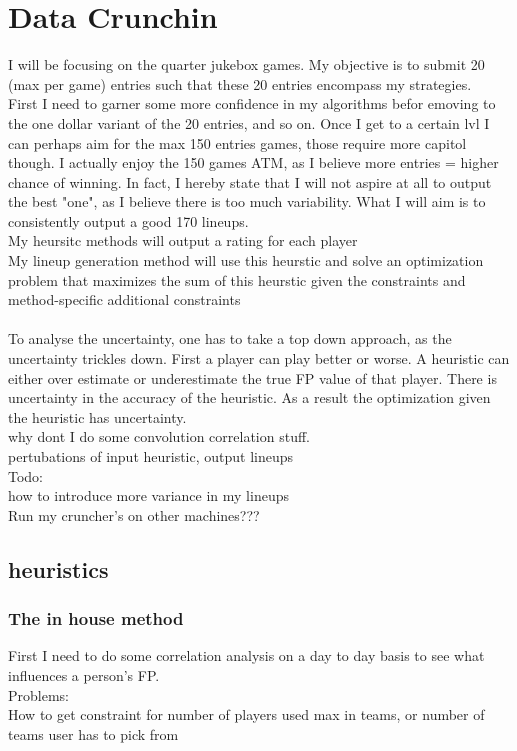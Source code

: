 \documentclass[11pt, oneside]{book}   	%
\begin{document}
\chapter{Data Crunchin}
I will be focusing on the quarter jukebox games. My objective is to submit 20 (max per game) entries such that these 20 entries encompass my strategies. \\ First I need to garner some more confidence in my algorithms befor emoving to the one dollar variant of the 20 entries, and so on. Once I get to a certain lvl I can perhaps aim for the max 150 entries games, those require more capitol though. I actually enjoy the 150 games ATM, as I believe more entries = higher chance of winning. In fact, I hereby state that I will not aspire at all to output the best "one", as I believe there is too much variability. What I will aim is to consistently output a good 170 lineups.  
\\
My heursitc methods will output a rating for each player\\
My lineup generation method will use this heurstic and solve an optimization problem that maximizes the sum of this heurstic given the constraints and method-specific additional constraints\\
\\
To analyse the uncertainty, one has to take a top down approach, as the uncertainty trickles down. First a player can play better or worse. A heuristic can either over estimate or underestimate the true FP value of that player. There is uncertainty in the accuracy of the heuristic. As a result the optimization given the heuristic has uncertainty.
\\
why dont I do some convolution correlation stuff.
\\
pertubations of input heuristic, output lineups
\\
Todo:\\
how to introduce more variance in my lineups\\
Run my cruncher's on other machines???

\section{heuristics} 
\subsection{The in house method}
First I need to do some correlation analysis on a day to day basis to see what influences a person's FP. 
\\
Problems:\\
How to get constraint for number of players used max in teams, or number of teams user has to pick from
\end{document}
